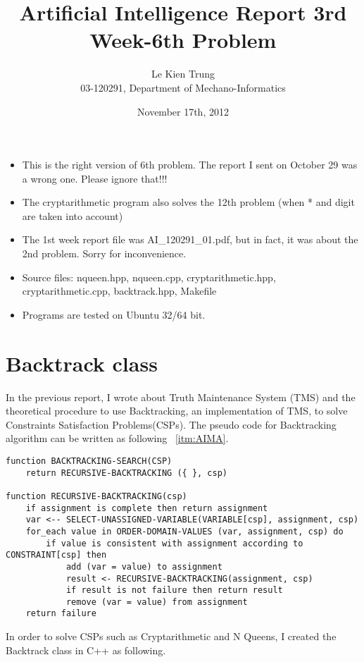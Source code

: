 \documentclass[a4paper, 11pt]{article}
\begin{document}
\title{Artificial Intelligence Report 3rd Week-6th Problem}
\author{Le Kien Trung \\ 03-120291, Department of Mechano-Informatics}
\date{November 17th, 2012}
\maketitle
\begin{itemize}
\item This is the right version of 6th problem. The report I sent on October 29 was a wrong one. Please ignore that!!!
\item The cryptarithmetic program also solves the 12th problem (when * and digit are taken into account)
\item The 1st week report file was AI\_120291\_01.pdf, but in fact, it was about the 2nd problem. Sorry for inconvenience.
\item Source files: nqueen.hpp, nqueen.cpp, cryptarithmetic.hpp, cryptarithmetic.cpp, backtrack.hpp, Makefile
\item Programs are tested on Ubuntu 32/64 bit.
\end{itemize}

\section{Backtrack class}
In the previous report, I wrote about Truth Maintenance System (TMS) and the theoretical procedure to use Backtracking, an implementation of TMS, to solve Constraints Satisfaction Problems(CSPs). The pseudo code for Backtracking algorithm can be written as following ~\ref{itm:AIMA}.
\begin{lstlisting}
function BACKTRACKING-SEARCH(CSP)
	return RECURSIVE-BACKTRACKING ({ }, csp)

function RECURSIVE-BACKTRACKING(csp)
	if assignment is complete then return assignment
	var <-- SELECT-UNASSIGNED-VARIABLE(VARIABLE[csp], assignment, csp)
	for_each value in ORDER-DOMAIN-VALUES (var, assignment, csp) do
		if value is consistent with assignment according to CONSTRAINT[csp] then
			add (var = value) to assignment
			result <- RECURSIVE-BACKTRACKING(assignment, csp)
			if result is not failure then return result
			remove (var = value) from assignment
	return failure
\end{lstlisting}
In order to solve CSPs such as Cryptarithmetic and N Queens, I created the Backtrack class in C++ as following.

\end{document}
